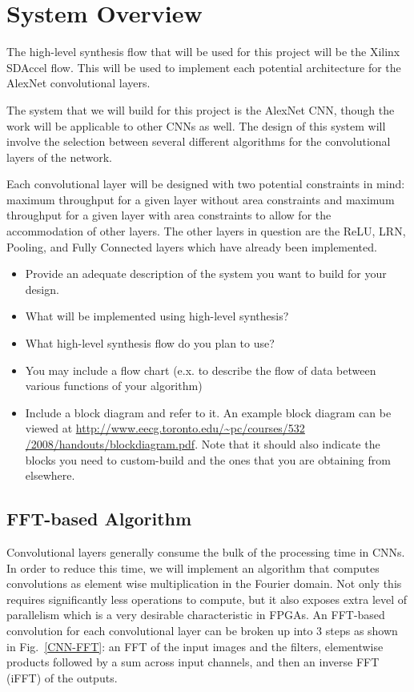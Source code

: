 \documentclass[conference,compsoc]{IEEEtran/IEEEtran}
\begin{document}
\section{System Overview}\label{section:overview}

The high-level synthesis flow that will be used for this project will be the Xilinx 
SDAccel flow. This will be used to implement each potential architecture for the 
AlexNet convolutional layers. 

The system that we will build for this project is the AlexNet CNN, though the work 
will be applicable to other CNNs as well. The design of this system will involve the 
selection between several different algorithms for the convolutional layers of the 
network. 

Each convolutional layer will be designed with two potential constraints in mind: 
maximum throughput for a given layer without area constraints and maximum throughput
for a given layer with area constraints to allow for the accommodation of other 
layers. The other layers in question are the ReLU, LRN, Pooling, and Fully Connected
layers which have already been implemented. 

\begin{itemize}
\item Provide an adequate description of the system you want to build for your design.
\item What will be implemented using high-level synthesis?
\item What high-level synthesis flow do you plan to use?
\item You may include a flow chart (e.x. to describe the flow of data between various functions of your algorithm)
\item Include a block diagram and refer to it.
An example block diagram can be viewed at \href{http://www.eecg.toronto.edu/~pc/courses/532/2008/handouts/blockdiagram.pdf}{http://www.eecg.toronto.edu/\~{}pc/courses/532 /2008/handouts/blockdiagram.pdf}.
Note that it should also indicate the blocks you need to custom-build and the ones that you are obtaining from elsewhere.
\end{itemize}

\subsection{FFT-based Algorithm}
Convolutional layers generally consume the bulk of the processing time in CNNs. In order to reduce this time, we will implement an algorithm that computes convolutions as element wise multiplication in the Fourier domain. Not only this requires significantly less operations to compute, but it also exposes extra level of parallelism which is a very desirable characteristic in FPGAs. An FFT-based convolution for each convolutional layer can be broken up into $3$ steps as shown in Fig.~\ref{CNN-FFT}: an FFT of the input images and the filters, elementwise products followed by a sum across input channels, and then an inverse FFT (iFFT) of the outputs.
\end{document}
